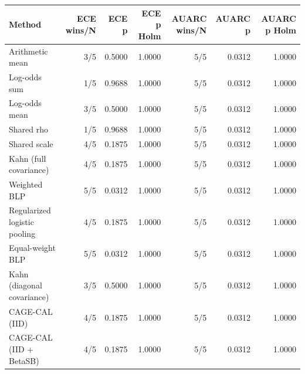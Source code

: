 \begin{tabular}{lrrrrrr}
\toprule
Method & ECE wins/N & ECE p & ECE p Holm & AUARC wins/N & AUARC p & AUARC p Holm \\
\midrule
Arithmetic mean & 3/5 & 0.5000 & 1.0000 & 5/5 & 0.0312 & 1.0000 \\
Log-odds sum & 1/5 & 0.9688 & 1.0000 & 5/5 & 0.0312 & 1.0000 \\
Log-odds mean & 3/5 & 0.5000 & 1.0000 & 5/5 & 0.0312 & 1.0000 \\
Shared rho & 1/5 & 0.9688 & 1.0000 & 5/5 & 0.0312 & 1.0000 \\
Shared scale & 4/5 & 0.1875 & 1.0000 & 5/5 & 0.0312 & 1.0000 \\
Kahn (full covariance) & 4/5 & 0.1875 & 1.0000 & 5/5 & 0.0312 & 1.0000 \\
Weighted BLP & 5/5 & 0.0312 & 1.0000 & 5/5 & 0.0312 & 1.0000 \\
Regularized logistic pooling & 4/5 & 0.1875 & 1.0000 & 5/5 & 0.0312 & 1.0000 \\
Equal-weight BLP & 5/5 & 0.0312 & 1.0000 & 5/5 & 0.0312 & 1.0000 \\
Kahn (diagonal covariance) & 3/5 & 0.5000 & 1.0000 & 5/5 & 0.0312 & 1.0000 \\
CAGE-CAL (IID) & 4/5 & 0.1875 & 1.0000 & 5/5 & 0.0312 & 1.0000 \\
CAGE-CAL (IID + BetaSB) & 4/5 & 0.1875 & 1.0000 & 5/5 & 0.0312 & 1.0000 \\
\bottomrule
\end{tabular}
